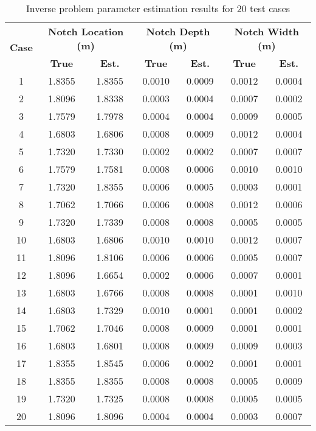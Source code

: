 \documentclass[12pt,a4paper]{report}
\begin{document}
\begin{table}[htbp]
\centering
\small
\caption{Inverse problem parameter estimation results for 20 test cases}
\label{tab:inverse_results}
\begin{tabular}{|c|c|c|c|c|c|c|}
\hline
\multirow{2}{*}{\textbf{Case}} & \multicolumn{2}{c|}{\textbf{Notch Location (m)}} & \multicolumn{2}{c|}{\textbf{Notch Depth (m)}} & \multicolumn{2}{c|}{\textbf{Notch Width (m)}} \\
\cline{2-7}
 & \textbf{True} & \textbf{Est.} & \textbf{True} & \textbf{Est.} & \textbf{True} & \textbf{Est.} \\
\hline
1 & 1.8355 & 1.8355 & 0.0010 & 0.0009 & 0.0012 & 0.0004 \\
2 & 1.8096 & 1.8338 & 0.0003 & 0.0004 & 0.0007 & 0.0002 \\
3 & 1.7579 & 1.7978 & 0.0004 & 0.0004 & 0.0009 & 0.0005 \\
4 & 1.6803 & 1.6806 & 0.0008 & 0.0009 & 0.0012 & 0.0004 \\
5 & 1.7320 & 1.7330 & 0.0002 & 0.0002 & 0.0007 & 0.0007 \\
6 & 1.7579 & 1.7581 & 0.0008 & 0.0006 & 0.0010 & 0.0010 \\
7 & 1.7320 & 1.8355 & 0.0006 & 0.0005 & 0.0003 & 0.0001 \\
8 & 1.7062 & 1.7066 & 0.0006 & 0.0008 & 0.0012 & 0.0006 \\
9 & 1.7320 & 1.7339 & 0.0008 & 0.0008 & 0.0005 & 0.0005 \\
10 & 1.6803 & 1.6806 & 0.0010 & 0.0010 & 0.0012 & 0.0007 \\
11 & 1.8096 & 1.8106 & 0.0006 & 0.0006 & 0.0005 & 0.0007 \\
12 & 1.8096 & 1.6654 & 0.0002 & 0.0006 & 0.0007 & 0.0001 \\
13 & 1.6803 & 1.6766 & 0.0008 & 0.0008 & 0.0001 & 0.0010 \\
14 & 1.6803 & 1.7329 & 0.0010 & 0.0001 & 0.0001 & 0.0002 \\
15 & 1.7062 & 1.7046 & 0.0008 & 0.0009 & 0.0001 & 0.0001 \\
16 & 1.6803 & 1.6801 & 0.0008 & 0.0009 & 0.0009 & 0.0003 \\
17 & 1.8355 & 1.8545 & 0.0006 & 0.0002 & 0.0001 & 0.0001 \\
18 & 1.8355 & 1.8355 & 0.0008 & 0.0008 & 0.0005 & 0.0009 \\
19 & 1.7320 & 1.7325 & 0.0008 & 0.0008 & 0.0005 & 0.0005 \\
20 & 1.8096 & 1.8096 & 0.0004 & 0.0004 & 0.0003 & 0.0007 \\
\hline
\end{tabular}
\end{table}
\end{document}
